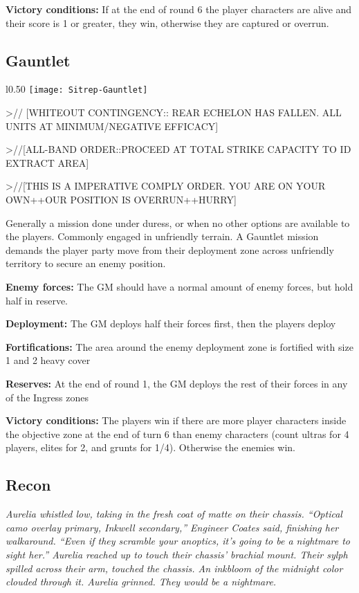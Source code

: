 \textbf{Victory conditions:}  If at the end of round 6 the player characters are alive and their score is 1 or greater, they win, otherwise they are captured or overrun.

\newpage
\subsection{Gauntlet}

\begin{wrapfigure}{l}{0.50\textwidth}
  \centering
  \texttt{[image: Sitrep-Gauntlet]}
\end{wrapfigure}

>// [WHITEOUT CONTINGENCY:: REAR ECHELON HAS FALLEN. ALL UNITS AT
MINIMUM/NEGATIVE EFFICACY]

>//[ALL-BAND ORDER::PROCEED AT TOTAL STRIKE CAPACITY TO ID EXTRACT AREA]

>//[THIS IS A IMPERATIVE COMPLY ORDER. YOU ARE ON YOUR OWN++OUR POSITION IS
OVERRUN++HURRY]

Generally a mission done under duress, or when no other options are available to the players. Commonly engaged in unfriendly terrain. A Gauntlet mission demands the player party move from their deployment zone across unfriendly territory to secure an enemy position.

\textbf{Enemy forces:} The GM should have a normal amount of enemy forces, but hold half in reserve.

\textbf{Deployment:} The GM deploys half their forces first, then the players deploy

\textbf{Fortifications:} The area around the enemy deployment zone is fortified with size 1 and 2 heavy cover

\textbf{Reserves:} At the end of round 1, the GM deploys the rest of their forces in any of the Ingress zones

\textbf{Victory conditions:} The players win if there are more player characters inside the objective zone at the end of turn 6 than enemy characters (count ultras for 4 players, elites for 2, and grunts for 1/4). Otherwise the enemies win.

\subsection{Recon}
\textit{Aurelia whistled low, taking in the fresh coat of matte on their chassis. “Optical camo overlay primary, Inkwell secondary,” Engineer Coates said, finishing her walkaround. “Even if they scramble your anoptics, it’s going to be a nightmare to sight her.” Aurelia reached up to touch their chassis’ brachial mount. Their sylph spilled across their arm, touched the chassis. An inkbloom of the midnight color clouded through it. Aurelia grinned. They would be a nightmare.}

